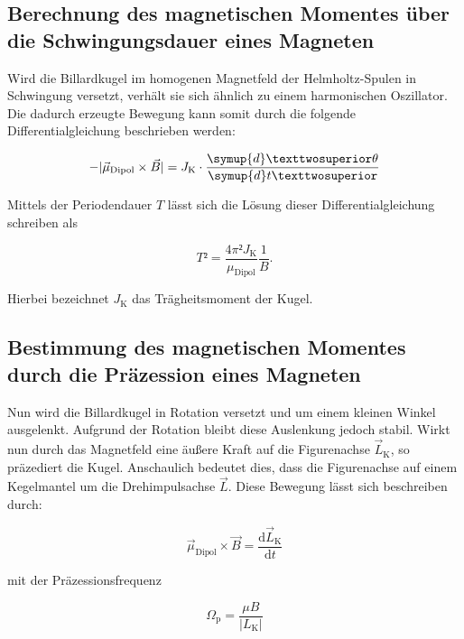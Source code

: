 \subsection{Berechnung des magnetischen Momentes über die Schwingungsdauer eines Magneten}

\noindent Wird die Billardkugel im homogenen Magnetfeld der Helmholtz-Spulen in Schwingung versetzt, verhält sie sich 
ähnlich zu einem harmonischen Oszillator. Die dadurch erzeugte Bewegung kann somit durch die folgende Differentialgleichung
beschrieben werden:

\begin{equation*}
    - | \vec{\mu}_\text{Dipol} \times \vec{B} | = J_\text{K} \cdot \frac{\symup{d}²\theta}{\symup{d}t²}
\end{equation*}

\noindent Mittels der Periodendauer $T$ lässt sich die Lösung dieser Differentialgleichung schreiben als 

\begin{equation*}
    T² = \frac{4\pi²J_\text{K}}{\mu_\text{Dipol}}\frac{1}{B}.
\end{equation*}

\noindent Hierbei bezeichnet $J_\text{K}$ das Trägheitsmoment der Kugel.

\subsection{Bestimmung des magnetischen Momentes durch die Präzession eines Magneten}

\noindent Nun wird die Billardkugel in Rotation versetzt und um einem kleinen Winkel ausgelenkt. Aufgrund 
der Rotation bleibt diese Auslenkung jedoch stabil. Wirkt nun durch das Magnetfeld eine äußere Kraft auf die 
Figurenachse $\vec{L}_\text{K}$, so präzediert die Kugel. Anschaulich bedeutet dies, dass die Figurenachse auf einem Kegelmantel 
um die Drehimpulsachse $\vec{L}$. Diese Bewegung lässt sich beschreiben durch:

\begin{equation*}
    \vec{\mu}_\text{Dipol} \times \vec{B} = \frac{\text{d}\vec{L}_\text{K}}{\text{d}t}
\end{equation*}

\noindent mit der Präzessionsfrequenz 

\begin{equation*}
    \Omega_\text{p} = \frac{\mu B}{| L_\text{K} |}
\end{equation*}

